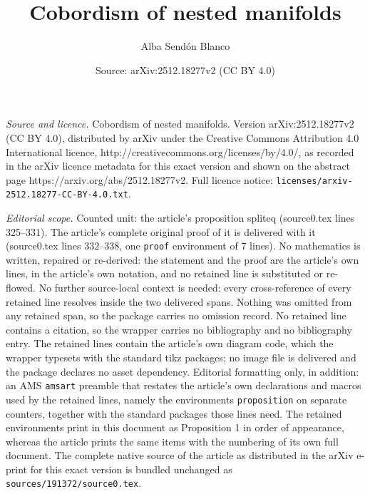 \documentclass[10pt,a4paper]{amsart}
\title{Cobordism of nested manifolds}
\author{Alba Send\'on Blanco}
\date{Source: arXiv:2512.18277v2 (CC BY 4.0)}
\newtheorem{proposition}{Proposition}
\newcommand{\Th}{\mathrm{Th}}
\begin{document}
\maketitle

\noindent\emph{Source and licence.} Cobordism of nested manifolds. Version arXiv:2512.18277v2 (CC BY 4.0), distributed by arXiv under the Creative Commons Attribution 4.0 International licence, http://creativecommons.org/licenses/by/4.0/, as recorded in the arXiv licence metadata for this exact version and shown on the abstract page https://arxiv.org/abs/2512.18277v2. Full licence notice: \texttt{licenses/arxiv-2512.18277-CC-BY-4.0.txt}.\par\smallskip

\noindent\textit{Editorial scope.} Counted unit: the article's proposition spliteq (source0.tex lines 325--331). The article's complete original proof of it is delivered with it (source0.tex lines 332--338, one \texttt{proof} environment of 7 lines). No mathematics is written, repaired or re-derived: the statement and the proof are the article's own lines, in the article's own notation, and no retained line is substituted or re-flowed.  No further source-local context is needed: every cross-reference of every retained line resolves inside the two delivered spans.  Nothing was omitted from any retained span, so the package carries no omission record.  No retained line contains a citation, so the wrapper carries no bibliography and no bibliography entry.  The retained lines contain the article's own diagram code, which the wrapper typesets with the standard tikz packages; no image file is delivered and the package declares no asset dependency.  Editorial formatting only, in addition: an AMS \texttt{amsart} preamble that restates the article's own declarations and macros used by the retained lines, namely the environments \texttt{proposition} on separate counters, together with the standard packages those lines need.  The retained environments print in this document as Proposition 1 in order of appearance, whereas the article prints the same items with the numbering of its own full document.  The complete native source of the article as distributed in the arXiv e-print for this exact version is bundled unchanged as \texttt{sources/191372/source0.tex}.
\end{document}
